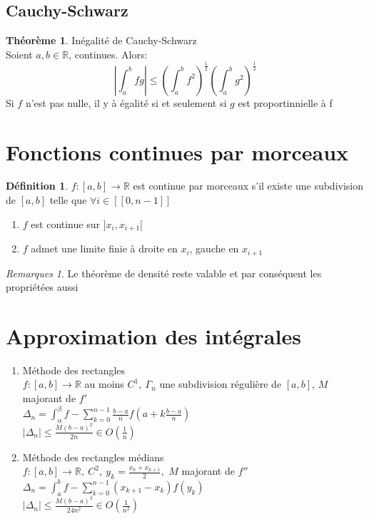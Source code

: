 \documentclass[fleqn]{article}
\theoremstyle{definition} \newtheorem*{defi}{D\'efinition}
\theoremstyle{definition} \newtheorem*{theo}{Th\'eor\`eme}
\theoremstyle{definition} \newtheorem*{coro}{Corollaire}
\theoremstyle{remark} \newtheorem*{rqs}{Remarques}
\theoremstyle{definition} \newtheorem*{prop}{Propri\'et\'e}
\begin{document}
\subsection{Cauchy-Schwarz}
\begin{theo} In\'egalit\'e de Cauchy-Schwarz \\
	Soient $a,b \in \mathbb{R}$, continues. Alors:
	\[\left|\int_a^b fg\right| \leq \left(\int_a^b f^2\right)^\frac{1}{2} \left(\int_a^b g^2\right)^\frac{1}{2}\]
	Si $f$ n'est pas nulle, il y \`a \'egalit\'e si et seulement si $g$ est proportinnielle \`a f
\end{theo}

\section{Fonctions continues par morceaux}
\begin{defi}
	$f:[a,b] \rightarrow \mathbb{R}$ est continue par morceaux s'il existe une subdivision de $[a,b]$ telle que $\forall i \in [\![0,n-1]\!]$
	\begin{enumerate}
		\item $f$ est continue sur $]x_i, x_{i+1}[$
		\item $f$ admet une limite finie \`a droite en $x_i$, gauche en $x_{i+1}$
	\end{enumerate}
\end{defi}

\begin{rqs}
	Le th\'eor\`eme de densit\'e reste valable et par cons\'equent les propri\'et\'ees aussi
\end{rqs}

\section{Approximation des int\'egrales}
\begin{enumerate}
	\item M\'ethode des rectangles \\
		$f:[a,b] \rightarrow \mathbb{R}$ au moins $C^1,\ \Gamma_n$ une subdivision r\'eguli\`ere de $[a,b]$, $M$ majorant de $f'$ \\
		$\Delta_n = \int_\alpha^\beta f - \sum_{k=0}^{n-1} \frac{b-a}{n} f(a + k\frac{b-a}{n})$ \\
		$|\Delta_n| \leq \frac{M(b-a)^2}{2n} \in O(\frac{1}{n})$
	\item M\'ethode des rectangles m\'edians \\
		$f:[a,b] \rightarrow \mathbb{R},\ C^2,\ y_k = \frac{x_k + x_{k+1}}{2},$ $M$ majorant de $f''$\\
		$\Delta_n = \int_a^b f - \sum_{k=0}^{n-1} (x_{k+1} - x_k)f(y_k)$ \\
		$|\Delta_n| \leq \frac{M(b-a)^3}{24n^2} \in O(\frac{1}{n^2})$

\end{enumerate}
\end{document}

